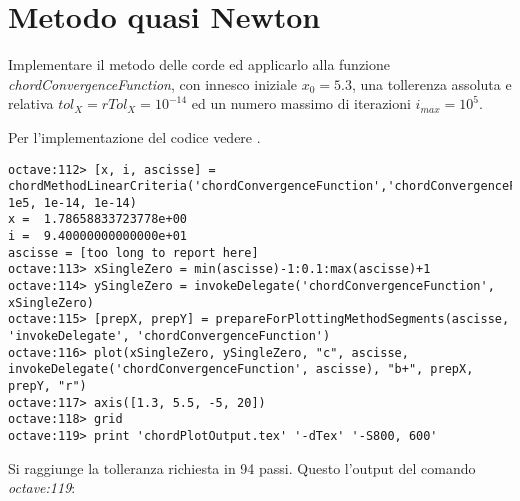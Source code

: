 \section{Metodo quasi Newton}
\label{sec:metodiQuasiNewton}

\begin{exercise}
Implementare il metodo delle corde ed applicarlo alla funzione
\emph{chordConvergenceFunction}, con innesco iniziale $x_{0} = 5.3$, una tollerenza assoluta e relativa
$tol_{X} = rTol_{X} = 10^{-14}$ ed un numero massimo di iterazioni
$i_{max} = 10^{5}$.
\end{exercise}
Per l'implementazione del codice vedere .
\begin{lstlisting}
octave:112> [x, i, ascisse] =
chordMethodLinearCriteria('chordConvergenceFunction','chordConvergenceFunctionDerivative',5.3, 1e5, 1e-14, 1e-14) 
x =  1.78658833723778e+00
i =  9.40000000000000e+01
ascisse = [too long to report here]
octave:113> xSingleZero = min(ascisse)-1:0.1:max(ascisse)+1
octave:114> ySingleZero = invokeDelegate('chordConvergenceFunction', xSingleZero)
octave:115> [prepX, prepY] = prepareForPlottingMethodSegments(ascisse, 'invokeDelegate', 'chordConvergenceFunction')
octave:116> plot(xSingleZero, ySingleZero, "c", ascisse, invokeDelegate('chordConvergenceFunction', ascisse), "b+", prepX, prepY, "r")
octave:117> axis([1.3, 5.5, -5, 20])
octave:118> grid
octave:119> print 'chordPlotOutput.tex' '-dTex' '-S800, 600'
\end{lstlisting}
Si raggiunge la tolleranza richiesta in 94 passi. Questo l'output del comando
\emph{octave:119}:
\begin{center}

\end{center}


